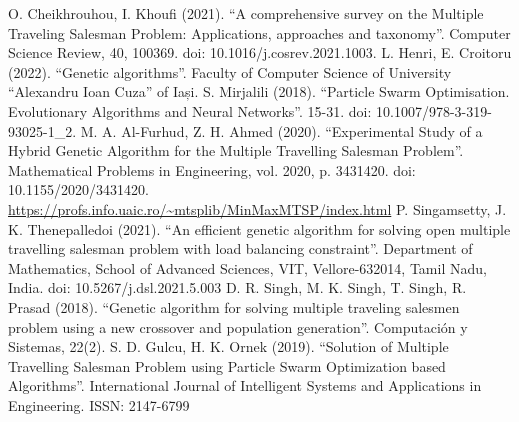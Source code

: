 \documentclass[conference]{IEEEtran}
\begin{document}
\begin{thebibliography}{00}
     O. Cheikhrouhou, I. Khoufi (2021). ``A comprehensive survey on the Multiple Traveling Salesman Problem: Applications, approaches and taxonomy''. Computer Science Review, 40, 100369. doi: 10.1016/j.cosrev.2021.1003.
     L. Henri, E. Croitoru (2022). ``Genetic algorithms''. Faculty of Computer Science of University ``Alexandru Ioan Cuza'' of Iași.
     S. Mirjalili (2018). ``Particle Swarm Optimisation. Evolutionary Algorithms and Neural Networks''. 15-31. doi: 10.1007/978-3-319-93025-1\_2.
     M. A. Al-Furhud, Z. H. Ahmed (2020). ``Experimental Study of a Hybrid Genetic Algorithm for the Multiple Travelling Salesman Problem''. Mathematical Problems in Engineering, vol. 2020, p. 3431420. doi: 10.1155/2020/3431420.
     \url{https://profs.info.uaic.ro/~mtsplib/MinMaxMTSP/index.html}
     P. Singamsetty, J. K. Thenepalledoi (2021). ``An efficient genetic algorithm for solving open multiple travelling salesman problem with load
    balancing constraint''. Department of Mathematics, School of Advanced Sciences, VIT, Vellore-632014, Tamil Nadu, India. doi: 10.5267/j.dsl.2021.5.003
     D. R. Singh, M. K. Singh, T. Singh, R. Prasad (2018). ``Genetic algorithm for solving multiple traveling salesmen
    problem using a new crossover and population generation''. Computación y Sistemas, 22(2).
     S. D. Gulcu, H. K. Ornek (2019). ``Solution of Multiple Travelling Salesman Problem using Particle Swarm
    Optimization based Algorithms''. International Journal of
    Intelligent Systems and Applications in Engineering. ISSN: 2147-6799
\end{thebibliography}
    
\end{document}
